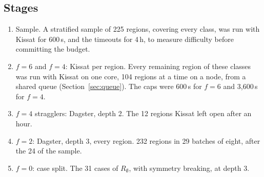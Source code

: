 \documentclass[11pt,a4paper]{article}
\theoremstyle{definition}
\begin{document}

\subsection{Stages}
\begin{enumerate}
\item Sample. A stratified sample of 225 regions, covering every class, was run with
Kissat for 600\,s, and the timeouts for 4\,h, to measure difficulty before committing the
budget.
\item $f=6$ and $f=4$: Kissat per region. Every remaining region of these classes was
run with Kissat on one core, 104 regions at a time on a node, from a shared queue
(Section~\ref{sec:queue}). The caps were 600\,s for $f=6$ and 3{,}600\,s for $f=4$.
\item $f=4$ stragglers: Dagster, depth 2. The 12 regions Kissat left open after an
hour.
\item $f=2$: Dagster, depth 3, every region. 232 regions in 29 batches of eight,
after the 24 of the sample.
\item $f=0$: case split. The 31 cases of $R_\emptyset$, with symmetry breaking, at
depth 3.
\end{enumerate}
\end{document}
